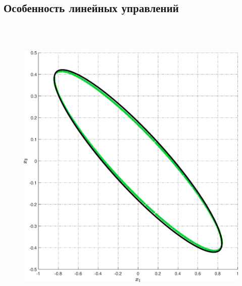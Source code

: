 \documentclass[../main.tex]{subfiles}
\begin{document}
  \subsection{Особенность линейных управлений}
     \begin{figure}[ht!] 
     \centering
  	\hspace{-2.5ex}
  	\begin{minipage}[b]{.4\linewidth} 
  		\small
  		\centering 
  		\includegraphics[width=\linewidth]{images/linear_system_linear_control.eps}
  		 \label{fig:ap:random_linear_system}
  	\end{minipage}
  	\hfill
  	\begin{minipage}[b]{.4\linewidth} 
  		\small
  		\centering

\end{minipage}
\end{figure}
\end{document}
